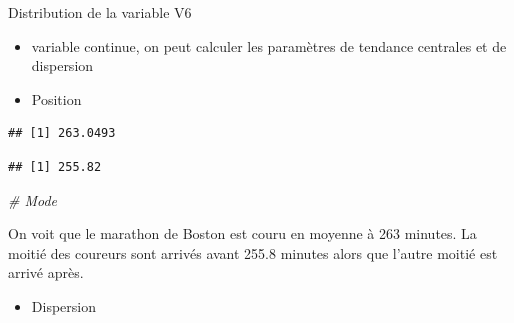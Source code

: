 \documentclass[ignorenonframetext,]{beamer}
\newenvironment{Shaded}{\begin{snugshade}}{\end{snugshade}}
\newcommand{\KeywordTok}[1]{\textcolor[rgb]{0.13,0.29,0.53}{\textbf{#1}}}
\newcommand{\CommentTok}[1]{\textcolor[rgb]{0.56,0.35,0.01}{\textit{#1}}}
\newcommand{\OperatorTok}[1]{\textcolor[rgb]{0.81,0.36,0.00}{\textbf{#1}}}
\newcommand{\NormalTok}[1]{#1}
\providecommand{\tightlist}{%
  \setlength{\itemsep}{0pt}\setlength{\parskip}{0pt}}
\begin{document}
\begin{frame}[fragile]{Distribution de la variable V6}

\begin{itemize}
\item
  variable continue, on peut calculer les paramètres de tendance
  centrales et de dispersion
\item
  Position
\end{itemize}

\begin{Shaded}
\end{Shaded}

\begin{verbatim}
## [1] 263.0493
\end{verbatim}

\begin{Shaded}
\end{Shaded}

\begin{verbatim}
## [1] 255.82
\end{verbatim}

\begin{Shaded}
\begin{Highlighting}[]
\CommentTok{# Mode}
\end{Highlighting}
\end{Shaded}

On voit que le marathon de Boston est couru en moyenne à 263 minutes. La
moitié des coureurs sont arrivés avant 255.8 minutes alors que l'autre
moitié est arrivé après.

\begin{itemize}
\tightlist
\item
  Dispersion
\end{itemize}

\begin{Shaded}
\end{Shaded}


\end{frame}
\end{document}
